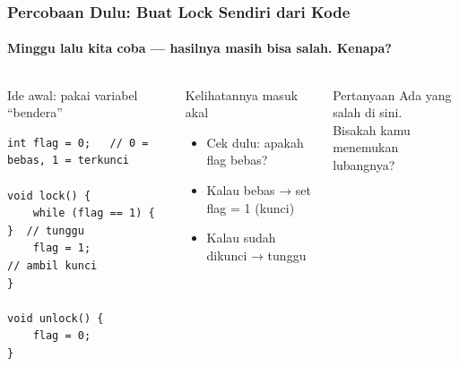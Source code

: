 \documentclass[t,aspectratio=169,xcolor=dvipsnames]{beamer}
\begin{document}
\begin{frame}[fragile,shrink=5]
    \frametitle{Percobaan Dulu: Buat Lock Sendiri dari Kode}
    \framesubtitle{Minggu lalu kita coba — hasilnya masih bisa salah. Kenapa?}
    \footnotesize

    \begin{columns}[T]
        \begin{alertblock}{Ide awal: pakai variabel ``bendera''}
\begin{lstlisting}[basicstyle=\ttfamily\scriptsize]
int flag = 0;   // 0 = bebas, 1 = terkunci

void lock() {
    while (flag == 1) { }  // tunggu
    flag = 1;              // ambil kunci
}

void unlock() {
    flag = 0;
}
\end{lstlisting}
        \end{alertblock}

        \begin{block}{Kelihatannya masuk akal}
            \begin{itemize}
                \item Cek dulu: apakah flag bebas?
                \item Kalau bebas → set flag = 1 (kunci)
                \item Kalau sudah dikunci → tunggu
            \end{itemize}
        \end{block}

        \begin{exampleblock}{Pertanyaan}
            \centering
            Ada yang salah di sini.\\
            Bisakah kamu menemukan lubangnya?
        \end{exampleblock}
    \end{columns}
\end{frame}
\end{document}
